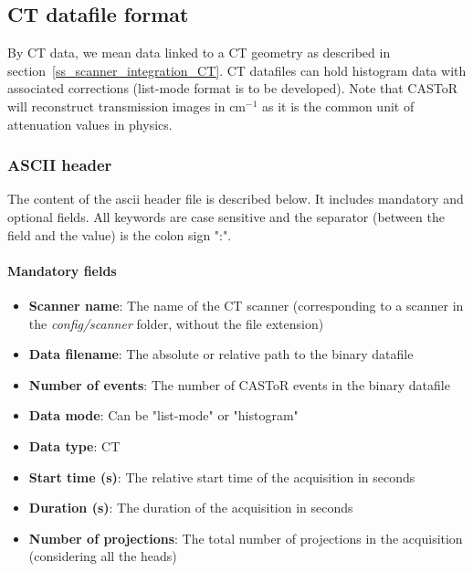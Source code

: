 \documentclass[a4paper, 11pt]{article}
\begin{document}
\newpage
\subsection{CT datafile format}
\label{ss_input_CT}

By CT data, we mean data linked to a CT geometry as described in section~\ref{ss_scanner_integration_CT}.
CT datafiles can hold histogram data with associated corrections (list-mode format is to be developed).
Note that CASToR will reconstruct transmission images in cm$^{-1}$ as it is the common unit of attenuation values in physics.

\subsubsection{ASCII header}

The content of the ascii header file is described below. It includes mandatory and optional fields. All keywords are case sensitive and the
separator (between the field and the value) is the colon sign ":".


\paragraph{Mandatory fields}
\begin{itemize}
  \item \textbf{Scanner name}: The name of the CT scanner (corresponding to a scanner in the \textit{config/scanner} folder, without
        the file extension)
  \item \textbf{Data filename}: The absolute or relative path to the binary datafile
  \item \textbf{Number of events}: The number of CASToR events in the binary datafile
  \item \textbf{Data mode}: Can be "list-mode" or "histogram"
  \item \textbf{Data type}: CT
  \item \textbf{Start time (s)}: The relative start time of the acquisition in seconds
  \item \textbf{Duration (s)}: The duration of the acquisition in seconds
  \item \textbf{Number of projections}: The total number of projections in the acquisition (considering all the heads)
\end{itemize}
\end{document}
